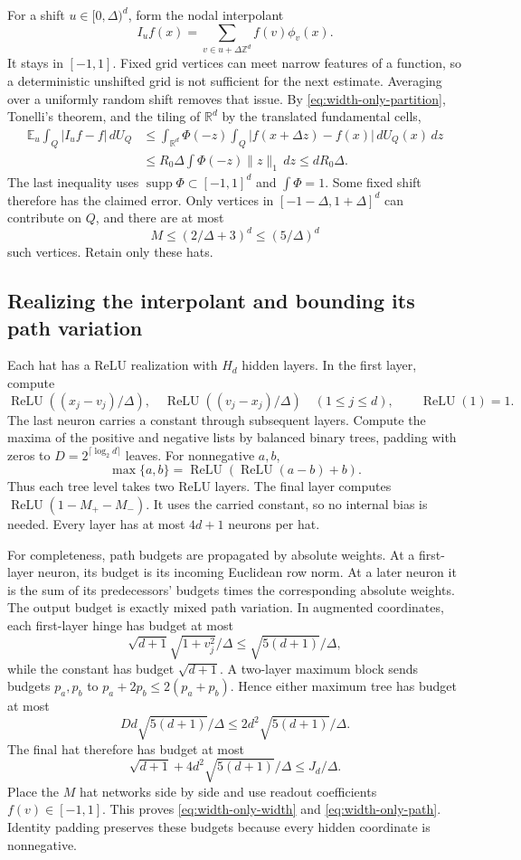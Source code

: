 For a shift $u\in[0,\Delta)^d$, form the nodal interpolant
\[
 I_uf(x)=\sum_{v\in u+\Delta\mathbb Z^d}f(v)\phi_v(x).
\]
It stays in $[-1,1]$. Fixed grid vertices can meet narrow features of a function, so a deterministic unshifted grid is not sufficient for the next estimate. Averaging over a uniformly random shift removes that issue. By \eqref{eq:width-only-partition}, Tonelli's theorem, and the tiling of $\mathbb R^d$ by the translated fundamental cells,
\begin{align*}
 \mathbb E_u\int_Q|I_uf-f|\,dU_Q
 &\le\int_{\mathbb R^d}\Phi(-z)
       \int_Q|f(x+\Delta z)-f(x)|\,dU_Q(x)\,dz\\
 &\le R_0\Delta\int\Phi(-z)\|z\|_1\,dz
 \le dR_0\Delta.
\end{align*}
The last inequality uses $\operatorname{supp}\Phi\subset[-1,1]^d$ and $\int\Phi=1$. Some fixed shift therefore has the claimed error. Only vertices in $[-1-\Delta,1+\Delta]^d$ can contribute on $Q$, and there are at most
\[
 M\le(2/\Delta+3)^d\le(5/\Delta)^d
\]
 such vertices. Retain only these hats.

\subsection{Realizing the interpolant and bounding its path variation}
Each hat has a ReLU realization with $H_d$ hidden layers. In the first layer, compute
\[
 \operatorname{ReLU}((x_j-v_j)/\Delta),\quad
 \operatorname{ReLU}((v_j-x_j)/\Delta)\quad(1\le j\le d),
 \qquad \operatorname{ReLU}(1)=1.
\]
The last neuron carries a constant through subsequent layers. Compute the maxima of the positive and negative lists by balanced binary trees, padding with zeros to $D=2^{\lceil\log_2d\rceil}$ leaves. For nonnegative $a,b$,
\[
 \max\{a,b\}=\operatorname{ReLU}(\operatorname{ReLU}(a-b)+b).
\]
Thus each tree level takes two ReLU layers. The final layer computes $\operatorname{ReLU}(1-M_+-M_-)$. It uses the carried constant, so no internal bias is needed. Every layer has at most $4d+1$ neurons per hat.

For completeness, path budgets are propagated by absolute weights. At a first-layer neuron, its budget is its incoming Euclidean row norm. At a later neuron it is the sum of its predecessors' budgets times the corresponding absolute weights. The output budget is exactly mixed path variation. In augmented coordinates, each first-layer hinge has budget at most
\[
 \sqrt{d+1}\sqrt{1+v_j^2}/\Delta\le\sqrt{5(d+1)}/\Delta,
\]
while the constant has budget $\sqrt{d+1}$. A two-layer maximum block sends budgets $p_a,p_b$ to $p_a+2p_b\le2(p_a+p_b)$. Hence either maximum tree has budget at most
\[
 Dd\sqrt{5(d+1)}/\Delta\le2d^2\sqrt{5(d+1)}/\Delta.
\]
The final hat therefore has budget at most
\[
 \sqrt{d+1}+4d^2\sqrt{5(d+1)}/\Delta
 \le J_d/\Delta.
\]
Place the $M$ hat networks side by side and use readout coefficients $f(v)\in[-1,1]$. This proves \eqref{eq:width-only-width} and \eqref{eq:width-only-path}. Identity padding preserves these budgets because every hidden coordinate is nonnegative.

